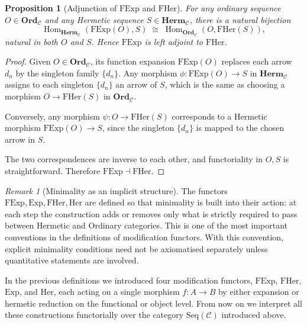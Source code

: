 \documentclass[11pt]{book}
\theoremstyle{definition}
\theoremstyle{plain}
\newtheorem{proposition}[theorem]{Proposition}
\theoremstyle{remark}
\newtheorem*{remark}{Remark}
\begin{document}
\begin{proposition}[Adjunction of $\mathrm{FExp}$ and $\mathrm{FHer}$]
For any ordinary sequence $O\in \mathbf{Ord}_\mathcal C$ 
and any Hermetic sequence $S\in \mathbf{Herm}_\mathcal C$, 
there is a natural bijection
\[
\operatorname{Hom}_{\mathbf{Herm}_\mathcal C}(\mathrm{FExp}(O), S)
\;\cong\;
\operatorname{Hom}_{\mathbf{Ord}_\mathcal C}(O, \mathrm{FHer}(S)),
\]
natural in both $O$ and $S$.  
Hence $\mathrm{FExp}$ is left adjoint to $\mathrm{FHer}$.
\end{proposition}

\begin{proof}
Given $O\in\mathbf{Ord}_\mathcal C$, its function expansion 
$\mathrm{FExp}(O)$ replaces each arrow $d_n$ by the singleton family $\{d_n\}$.  
Any morphism $\phi:\mathrm{FExp}(O)\to S$ in $\mathbf{Herm}_\mathcal C$ 
assigns to each singleton $\{d_n\}$ an arrow of $S$, 
which is the same as choosing a morphism 
$O\to \mathrm{FHer}(S)$ in $\mathbf{Ord}_\mathcal C$.  

Conversely, any morphism $\psi:O\to \mathrm{FHer}(S)$ 
corresponds to a Hermetic morphism $\mathrm{FExp}(O)\to S$, 
since the singleton $\{d_n\}$ is mapped to the chosen arrow in $S$.  

The two correspondences are inverse to each other, 
and functoriality in $O,S$ is straightforward.  
Therefore $\mathrm{FExp}\dashv \mathrm{FHer}$.
\end{proof}

\begin{remark}[Minimality as an implicit structure]
The functors $\mathrm{FExp},\mathrm{Exp},\mathrm{FHer},\mathrm{Her}$ are defined so that minimality is built into their action: 
at each step the construction adds or removes only what is strictly required to pass between Hermetic and Ordinary categories. 
This is one of the most important conventions in the definitions of modification functors. 
With this convention, explicit minimality conditions need not be axiomatised separately unless quantitative statements are involved.
\end{remark}

In the previous definitions we introduced four modification functors,
$\mathrm{FExp}$, $\mathrm{FHer}$, $\mathrm{Exp}$, and $\mathrm{Her}$,
each acting on a single morphism $f:A\to B$ by either expansion
or hermetic reduction on the functional or object level.
From now on we interpret all these constructions functorially
over the category $\mathrm{Seq}(\mathcal C)$ introduced above.
\end{document}
